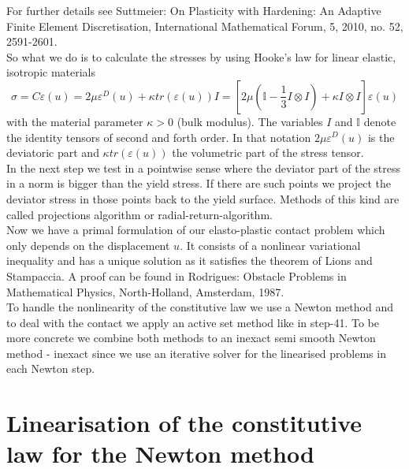 \documentclass{article}
\begin{document}
For further details see Suttmeier: On Plasticity with Hardening:
An Adaptive Finite Element Discretisation, International Mathematical Forum, 5,
2010, no. 52, 2591-2601.\\
So what we do is to calculate the stresses
by using Hooke's law for linear elastic,  isotropic materials $$\sigma = C \varepsilon(u) = 2\mu \varepsilon^D(u) + \kappa tr(\varepsilon(u))I = \left[2\mu\left(\mathbb{I} -\dfrac{1}{3} I\otimes I\right) + \kappa I\otimes I\right]\varepsilon(u)$$
with the material parameter $\kappa>0$ (bulk modulus). The variables $I$ and
$\mathbb{I}$ denote the identity tensors of second and forth order. In that
notation $2\mu \varepsilon^D(u)$ is the deviatoric part and $\kappa
tr(\varepsilon(u))$ the volumetric part of the stress tensor.\\
In the next step we test in a pointwise sense where the deviator part of the
stress in a norm is bigger than the yield stress. If there are such points we
project the deviator stress in those points back to the yield surface. Methods of this kind are called projections algorithm or radial-return-algorithm.\\
Now we have a primal formulation of our elasto-plastic contact problem which only depends on the displacement $u$.
It consists of a nonlinear variational inequality and has a unique solution as
it satisfies the theorem of Lions and Stampaccia. A proof can be found in
Rodrigues: Obstacle Problems in Mathematical Physics, North-Holland, Amsterdam,
1987.\\
To handle the nonlinearity of the constitutive law we use a Newton method and to deal with the contact we apply an
active set method like in step-41. To be more concrete we combine both methods to an inexact semi smooth Newton
method - inexact since we use an iterative solver for the linearised problems in each Newton step.

\section{Linearisation of the constitutive law for the Newton method}
\end{document}
